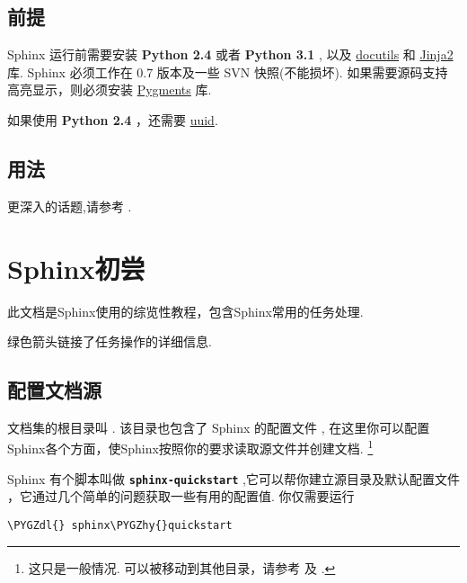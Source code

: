 \documentclass[letterpaper,10pt,english]{sphinxmanual}
\def\PYGZdl{\char`\$}
\def\PYGZhy{\char`\-}
\begin{document}
\section{前提}
\label{intro:id4}
Sphinx 运行前需要安装 \textbf{Python 2.4} 或者 \textbf{Python 3.1} , 以及
\href{http://docutils.sf.net/}{docutils} 和 \href{http://jinja.pocoo.org/}{Jinja2} 库.  Sphinx 必须工作在 0.7 版本及一些 SVN 快照(不能损坏).
如果需要源码支持高亮显示，则必须安装 \href{http://pygments.org/}{Pygments} 库.

如果使用 \textbf{Python 2.4} ，还需要 \href{http://pypi.python.org/pypi/uuid/}{uuid}.


\section{用法}
\label{intro:uuid}\label{intro:id5}
更深入的话题,请参考 {\hyperref[tutorial::doc]{}} .


\chapter{Sphinx初尝}
\label{tutorial::doc}\label{tutorial:sphinx}
此文档是Sphinx使用的综览性教程，包含Sphinx常用的任务处理.

绿色箭头链接了任务操作的详细信息.


\section{配置文档源}
\label{tutorial:id1}
文档集的根目录叫 {\hyperref[glossary:term\string-source\string-directory]{}}.  该目录也包含了 Sphinx 的配置文件 , 在这里你可以配置Sphinx各个方面，使Sphinx按照你的要求读取源文件并创建文档.  \footnote[1]{\sphinxAtStartFootnote%
这只是一般情况.  可以被移动到其他目录，请参考 {\hyperref[glossary:term\string-configuration\string-directory]{}} 及 {\hyperref[invocation:invocation]{}} .
}

Sphinx 有个脚本叫做 \textbf{\texttt{sphinx-quickstart}} ,它可以帮你建立源目录及默认配置文件  ，它通过几个简单的问题获取一些有用的配置值.
你仅需要运行

\begin{Verbatim}[commandchars=\\\{\}]
\PYGZdl{} sphinx\PYGZhy{}quickstart
\end{Verbatim}
\end{document}
